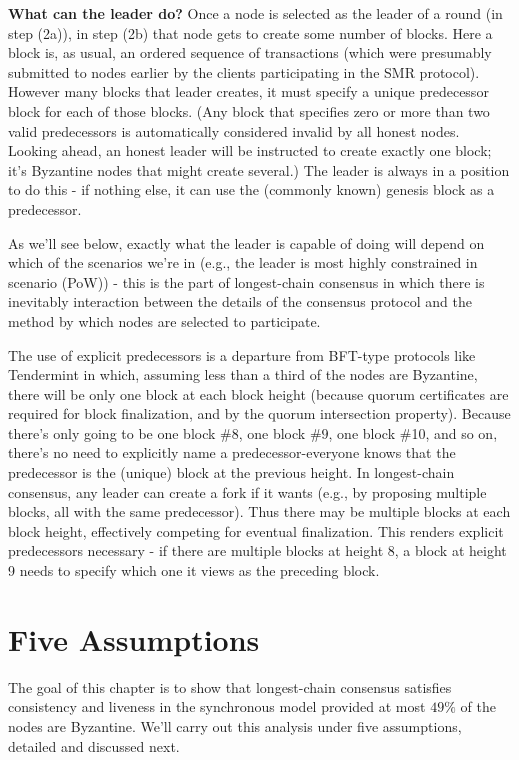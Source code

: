 \noindent
\textbf{What can the leader do?} Once a node is selected as the leader of a round (in step (2a)), in step (2b) that node gets to create some number of blocks. Here a block is, as usual, an ordered sequence of transactions (which were presumably submitted to nodes earlier by the clients participating in the SMR protocol). However many blocks that leader creates, it must specify a unique predecessor block for each of those blocks. (Any block that specifies zero or more than two valid predecessors is automatically considered invalid by all honest nodes. Looking ahead, an honest leader will be instructed to create exactly one block; it's Byzantine nodes that might create several.) The leader is always in a position to do this - if nothing else, it can use the (commonly known) genesis block as a predecessor.

As we'll see below, exactly what the leader is capable of doing will depend on which of the scenarios we're in (e.g., the leader is most highly constrained in scenario (PoW)) - this is the part of longest-chain consensus in which there is inevitably interaction between the details of the consensus protocol and the method by which nodes are selected to participate.

The use of explicit predecessors is a departure from BFT-type protocols like Tendermint in which, assuming less than a third of the nodes are Byzantine, there will be only one block at each block height (because quorum certificates are required for block finalization, and by the quorum intersection property). Because there's only going to be one block \#8, one block $\# 9$, one block \#10, and so on, there's no need to explicitly name a predecessor-everyone knows that the predecessor is the (unique) block at the previous height. In longest-chain consensus, any leader can create a fork if it wants (e.g., by proposing multiple blocks, all with the same predecessor). Thus there may be multiple blocks at each block height, effectively competing for eventual finalization. This renders explicit predecessors necessary - if there are multiple blocks at height 8, a block at height 9 needs to specify which one it views as the preceding block.

\section{Five Assumptions}

The goal of this chapter is to show that longest-chain consensus satisfies consistency and liveness in the synchronous model provided at most $49 \%$ of the nodes are Byzantine. We'll carry out this analysis under five assumptions, detailed and discussed next.

